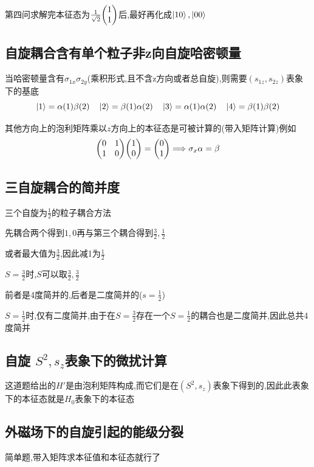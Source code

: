             第四问求解完本征态为$\frac{1}{\sqrt{2}}\mqty(1 \\ 1)$后,最好再化成$\ket{10},\ket{00}$

        \subsection{自旋耦合含有单个粒子非z向自旋哈密顿量}
            当哈密顿量含有$\sigma_{1x} \sigma_{2y}$(乘积形式,且不含z方向或者总自旋),则需要$(s_{1z},s_{2z})$表象下的基底
            $$
            \ket{1} = \alpha(1)\beta(2) \quad \ket{2} = \beta(1)\alpha(2) \quad \ket{3} = \alpha(1)\alpha(2) \quad  
            \ket{4} = \beta(1)\beta(2)  
            $$

            其他方向上的泡利矩阵乘以$z$方向上的本征态是可被计算的(带入矩阵计算)例如
            $$
            \mqty( 0 & 1 \\ 1 & 0 ) \mqty( 1 \\ 0 ) = \mqty( 0 \\ 1) \lra \sigma_{x}\alpha = \beta
            $$


        \subsection{三自旋耦合的简并度}
            \begin{formal}
                三个自旋为$\frac{1}{2}$的粒子耦合方法

                先耦合两个得到$1,0$再与第三个耦合得到$\frac{3}{2},\frac{1}{2}$

                或者最大值为$\frac{3}{2}$,因此减1为$\frac{1}{2}$
            \end{formal}

            $S = \frac{3}{2}$时,$ S $可以取$\frac{3}{2},\frac{3}{2}$
            
            前者是4度简并的,后者是二度简并的($s=\frac{1}{2}$)

            $S = \frac{1}{2}$时,仅有二度简并,由于在$S=\frac{3}{2}$存在一个$S=\frac{1}{2}$的耦合也是二度简并,因此总共4度简并

        \subsection{自旋 \texorpdfstring{$S^{2},s_{z}$}{}表象下的微扰计算}
            这道题给出的$H'$是由泡利矩阵构成,而它们是在$(S^{2},s_{z})$表象下得到的,因此此表象下的本征态就是$H_{0}$表象下的本征态

        \subsection{外磁场下的自旋引起的能级分裂}
            简单题,带入矩阵求本征值和本征态就行了
        
